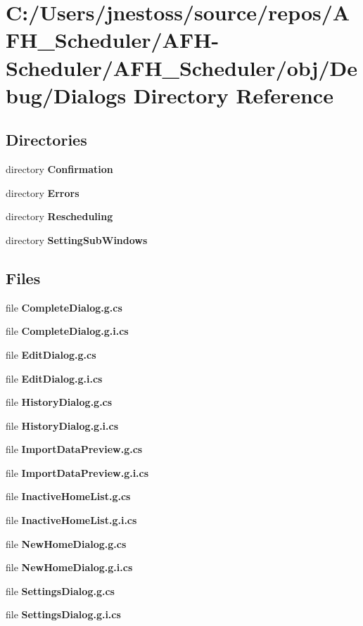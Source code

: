 \section{C\+:/\+Users/jnestoss/source/repos/\+A\+F\+H\+\_\+\+Scheduler/\+A\+F\+H-\/\+Scheduler/\+A\+F\+H\+\_\+\+Scheduler/obj/\+Debug/\+Dialogs Directory Reference}
\label{dir_e9afc162556d9b0c470666342f07f5c3}
\subsection*{Directories}
\begin{DoxyCompactItemize}
\item 
directory \textbf{ Confirmation}
\item 
directory \textbf{ Errors}
\item 
directory \textbf{ Rescheduling}
\item 
directory \textbf{ Setting\+Sub\+Windows}
\end{DoxyCompactItemize}
\subsection*{Files}
\begin{DoxyCompactItemize}
\item 
file \textbf{ Complete\+Dialog.\+g.\+cs}
\item 
file \textbf{ Complete\+Dialog.\+g.\+i.\+cs}
\item 
file \textbf{ Edit\+Dialog.\+g.\+cs}
\item 
file \textbf{ Edit\+Dialog.\+g.\+i.\+cs}
\item 
file \textbf{ History\+Dialog.\+g.\+cs}
\item 
file \textbf{ History\+Dialog.\+g.\+i.\+cs}
\item 
file \textbf{ Import\+Data\+Preview.\+g.\+cs}
\item 
file \textbf{ Import\+Data\+Preview.\+g.\+i.\+cs}
\item 
file \textbf{ Inactive\+Home\+List.\+g.\+cs}
\item 
file \textbf{ Inactive\+Home\+List.\+g.\+i.\+cs}
\item 
file \textbf{ New\+Home\+Dialog.\+g.\+cs}
\item 
file \textbf{ New\+Home\+Dialog.\+g.\+i.\+cs}
\item 
file \textbf{ Settings\+Dialog.\+g.\+cs}
\item 
file \textbf{ Settings\+Dialog.\+g.\+i.\+cs}
\end{DoxyCompactItemize}
